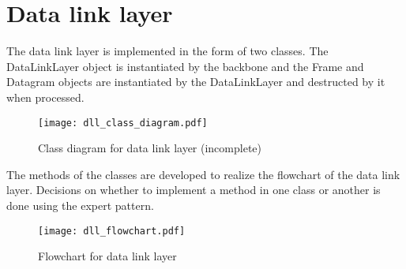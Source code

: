 \section{Data link layer}
The data link layer is implemented in the form of two classes. The DataLinkLayer
object is instantiated by the backbone and the Frame and Datagram objects are
instantiated by the DataLinkLayer and destructed by it when processed.

\begin{figure}[htb]
	\begin{center}
	\texttt{[image: dll\_class\_diagram.pdf]}
	\caption{Class diagram for data link layer (incomplete)}
	\label{fig:class_diag_for_datalink}	
	\end{center}
\end{figure}

The methods of the classes are developed to realize the flowchart of the data
link layer. Decisions on whether to implement a method in one class or another
is done using the expert pattern.

\begin{figure}[htb]
	\begin{center}
	\texttt{[image: dll\_flowchart.pdf]}
	\caption{Flowchart for data link layer}
	\label{fig:flowchart_for_datalink}	
	\end{center}
\end{figure}